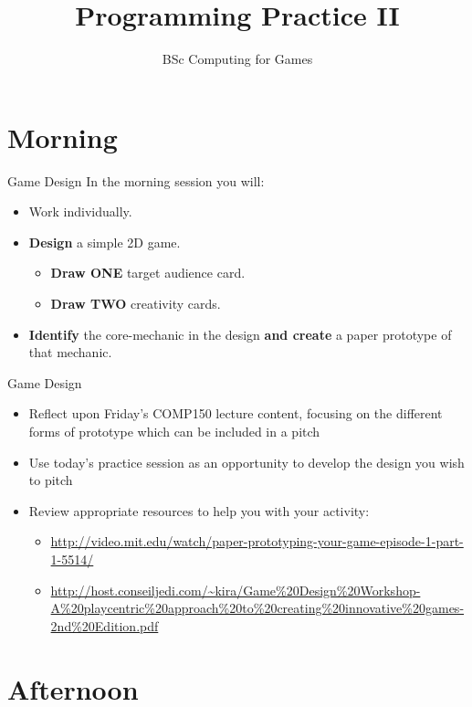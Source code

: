 \documentclass[xcolor={dvipsnames}]{beamer}\usepackage{etoolbox}\newtoggle{printable}\togglefalse{printable}
\begin{document}
\title{Programming Practice II}   
\subtitle{BSc Computing for Games}

\frame{\titlepage} 

\part{Morning}
\frame{\partpage}

\begin{frame}{Game Design}
	In the morning session you will:
	
	\begin{itemize}
		\item Work individually.
		\item \textbf{Design} a simple 2D game.
		\begin{itemize}
			\item \textbf{Draw ONE} target audience card. 
			\item \textbf{Draw TWO} creativity cards. 
		\end{itemize}
		\item \textbf{Identify} the core-mechanic in the design \textbf{and create}
		a paper prototype of that mechanic.
	\end{itemize}
\end{frame}

\begin{frame}{Game Design}
	\begin{itemize}
		\item Reflect upon Friday’s COMP150 lecture content, focusing on the different forms of prototype which can be included in a pitch
		\item Use today’s practice session as an opportunity to develop the design you wish to pitch
		\item Review appropriate resources to help you with your activity:
		\begin{itemize}
			\item \url{http://video.mit.edu/watch/paper-prototyping-your-game-episode-1-part-1-5514/}
			\item \url{http://host.conseiljedi.com/~kira/Game\%20Design\%20Workshop-A\%20playcentric\%20approach\%20to\%20creating\%20innovative\%20games-2nd\%20Edition.pdf}
		\end{itemize}
	\end{itemize}
\end{frame}

\part{Afternoon}
\frame{\partpage}
\end{document}
